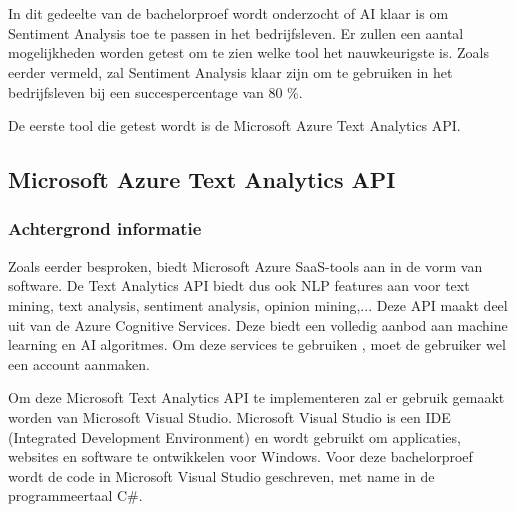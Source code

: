 
\chapter{}
\label{ch:methodologie}


In dit gedeelte van de bachelorproef wordt onderzocht of AI klaar is om Sentiment Analysis toe te passen in het bedrijfsleven. Er zullen een aantal mogelijkheden worden getest om te zien welke tool het nauwkeurigste is. Zoals eerder vermeld, zal Sentiment Analysis klaar zijn om te gebruiken in het bedrijfsleven bij een succespercentage van 80 \%. 

De eerste tool die getest wordt is de Microsoft Azure Text Analytics API. 

\section{Microsoft Azure Text Analytics API}

\subsection{Achtergrond informatie}
\label{achtergrondinformatieazure}
Zoals eerder besproken, biedt Microsoft Azure SaaS-tools aan in de vorm van software. De Text Analytics API biedt dus ook NLP features aan voor text mining, text analysis, sentiment analysis, opinion mining,... \autocite{Microsoft2020} Deze API maakt deel uit van de Azure Cognitive Services. Deze biedt een volledig aanbod aan machine learning en AI algoritmes. Om deze services te gebruiken , moet de gebruiker wel een account aanmaken. \autocite{Microsoft2020}

Om deze Microsoft Text Analytics API te implementeren zal er gebruik gemaakt worden van Microsoft Visual Studio. Microsoft Visual Studio is een IDE (Integrated Development Environment) en wordt gebruikt om applicaties, websites en software te ontwikkelen voor Windows. Voor deze bachelorproef wordt de code in Microsoft Visual Studio geschreven, met name in de programmeertaal C\#. 

